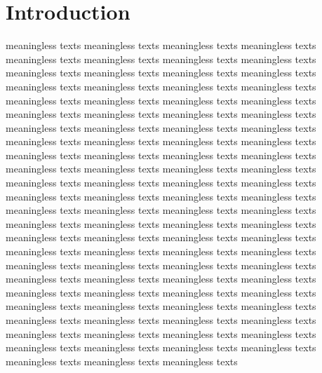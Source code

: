 \documentclass[12pt, twoside, notitlepage, twocolumn]{article}
\newcommand{\makeabs}
    {
        \textbf{Abstract:}
        A set of selected data samples which were collected by LHCb\cite{LHCb} in 2011 are studied.
        Contained $B^{\pm}\rightarrow\pi^{\pm}\pi^{+}\pi^{-}$ decays in magnet ``up'' and ``down'' 
        polarity are constructed.Global $CP$ asymmetry in this channal is measured to be 
        $A_{CP}=0.135\pm0.023\pm0.010$,
        in which the first and second uncertainties are statistical and systematical respectively.
        \newline\hbox{}
    }
\newcommand{\makeauth}
    {
        Qichen Dong, Harriet Watson\newline
        School of Physics and Astronomy, 
        University of Manchester, Manchester, M13 9PL.
    }
\newcommand{\maketit} 
    {
        \textbf{Measurement of $\bm{CP}$ Violation in $\bm{B^{\pm}\rightarrow\pi^{\pm}\pi^{+}\pi^{-}}$ 
        Decay Channal at Large Hadron Collider}
    }
\begin{document}
        \twocolumn[\begin{@twocolumnfalse}
            \begin{flushleft}
                \maketit
                \makeauth
            \end{flushleft}
            \makeabs
        \end{@twocolumnfalse}]

        \section{Introduction}
        meaningless texts meaningless texts meaningless texts meaningless texts meaningless texts 
        meaningless texts meaningless texts meaningless texts meaningless texts meaningless texts 
        meaningless texts meaningless texts meaningless texts meaningless texts meaningless texts 
        meaningless texts meaningless texts meaningless texts meaningless texts meaningless texts 
        meaningless texts meaningless texts meaningless texts meaningless texts meaningless texts 
        meaningless texts meaningless texts meaningless texts meaningless texts meaningless texts 
        meaningless texts meaningless texts meaningless texts meaningless texts meaningless texts 
        meaningless texts meaningless texts meaningless texts meaningless texts meaningless texts 
        meaningless texts meaningless texts meaningless texts meaningless texts meaningless texts 
        meaningless texts meaningless texts meaningless texts meaningless texts meaningless texts 
        meaningless texts meaningless texts meaningless texts meaningless texts meaningless texts 
        meaningless texts meaningless texts meaningless texts meaningless texts meaningless texts 
        meaningless texts meaningless texts meaningless texts meaningless texts meaningless texts 
        meaningless texts meaningless texts meaningless texts meaningless texts meaningless texts 
        meaningless texts meaningless texts meaningless texts meaningless texts meaningless texts 
        meaningless texts meaningless texts meaningless texts meaningless texts meaningless texts 
        meaningless texts meaningless texts meaningless texts meaningless texts meaningless texts 
        meaningless texts meaningless texts meaningless texts meaningless texts meaningless texts 
        meaningless texts meaningless texts meaningless texts meaningless texts meaningless texts 
\end{document}
